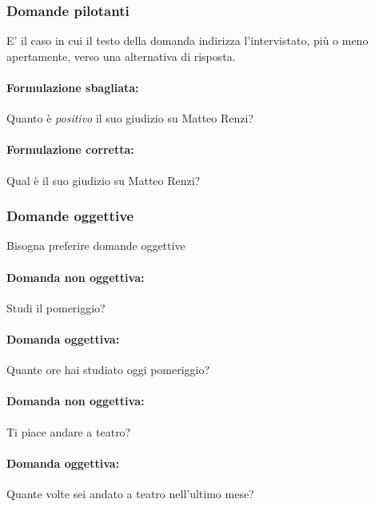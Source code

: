 \subsubsection{Domande pilotanti}
E’ il caso in cui il testo della domanda indirizza l’intervistato, più o meno apertamente, verso una alternativa di risposta.
\paragraph{Formulazione sbagliata:} Quanto è \textit{positivo} il suo giudizio su Matteo Renzi?

\paragraph{Formulazione corretta:} Qual è il suo giudizio su Matteo Renzi?

\subsubsection{Domande oggettive} 
Bisogna preferire domande oggettive
\paragraph{Domanda non oggettiva:} Studi il pomeriggio?
\paragraph{Domanda oggettiva:} Quante ore hai studiato oggi pomeriggio?
\paragraph{Domanda non oggettiva:} Ti piace andare a teatro?
\paragraph{Domanda oggettiva:} Quante volte sei andato a teatro nell'ultimo mese?
